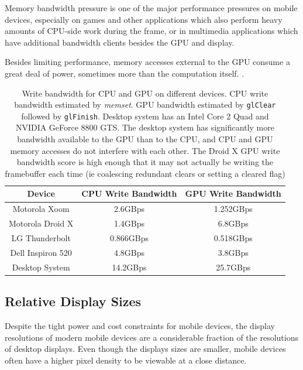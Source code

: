 
Memory bandwidth pressure is one of the major performance pressures on mobile
devices, especially on games and other applications which also perform heavy
amounts of CPU-side work during the frame, or in multimedia applications which
have additional bandwidth clients besides the GPU and display.

Besides limiting performance, memory accesses external to the GPU consume a
great deal of power, sometimes more than the computation itself.
\cite{Antochi04}.

\begin{table}[htb]\centering \begin{tabular}{|c||c|c|} 
\hline \small{Device} & \small{CPU Write Bandwidth} & \small{GPU Write Bandwidth}   \\ \hline 
\hline \small{Motorola Xoom} & \small{2.6GBps} & \small{1.252GBps} \\ 
\hline \small{Motorola Droid X} & \small{1.4GBps} & \small{6.8GBps} \\ 
\hline \small{LG Thunderbolt} & \small{0.866GBps} & \small{0.518GBps} \\ 
\hline \hline \small{Dell Inspiron 520} & \small{4.8GBps} & \small{3.8GBps} \\ 
\hline \small{Desktop System} & \small{14.2GBps} & \small{25.7GBps}\\
\hline
\end{tabular} 
\caption{Write bandwidth for CPU and GPU on different devices.  CPU write
bandwidth estimated by \textit{memset}.  GPU bandwidth estimated by \texttt{glClear}
followed by \texttt{glFinish}.  Desktop system has an Intel Core 2 Quad and NVIDIA
GeForce 8800 GTS.  The desktop system has significantly more bandwidth
available to the GPU than to the CPU, and CPU and GPU memory accesses do not
interfere with each other.  The Droid X GPU write bandwidth score is high enough
that it may not actually be writing the framebuffer each time (ie coalescing redundant clears or setting a cleared flag)}
\label{JonMcCaffrey:bandwidth} \end{table}

\subsection{Relative Display Sizes}\label{Jon-McCaffrey:relative-display-sizes}

 

Despite the tight power and cost constraints for mobile devices, the display
resolutions of modern mobile devices are a considerable fraction of the
resolutions of desktop displays.  Even though the displays sizes are smaller,
mobile devices often have a higher pixel density to be viewable at a close
distance.

